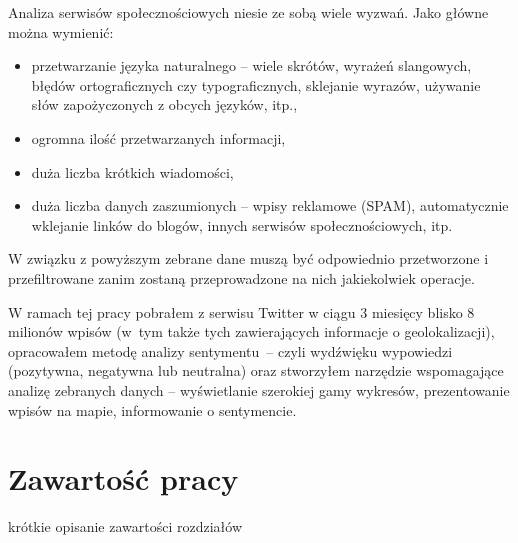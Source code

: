 Analiza serwisów społecznościowych niesie ze sobą wiele wyzwań. Jako główne
można wymienić:
\begin{itemize}
\item przetwarzanie języka naturalnego -- wiele skrótów,
wyrażeń slangowych, błędów ortograficznych czy typograficznych, sklejanie
wyrazów, używanie słów zapożyczonych z obcych języków, itp.,
\item ogromna ilość przetwarzanych informacji,
\item duża liczba krótkich wiadomości,
\item duża liczba danych zaszumionych -- wpisy reklamowe (SPAM), automatycznie 
wklejanie linków do blogów, innych serwisów społecznościowych, itp.
\end{itemize}

W związku z powyższym zebrane dane muszą być odpowiednio przetworzone i przefiltrowane
zanim zostaną przeprowadzone na nich jakiekolwiek operacje.

W ramach tej pracy pobrałem z serwisu Twitter w ciągu 3 miesięcy blisko 8 milionów
wpisów (w~tym także tych zawierających informacje o geolokalizacji), 
opracowałem metodę analizy sentymentu~-- czyli wydźwięku wypowiedzi (pozytywna,
negatywna lub neutralna) oraz stworzyłem narzędzie wspomagające
analizę zebranych danych -- wyświetlanie szerokiej gamy wykresów, prezentowanie
wpisów na mapie, informowanie o sentymencie.

\section{Zawartość pracy}
krótkie opisanie zawartości rozdziałów
